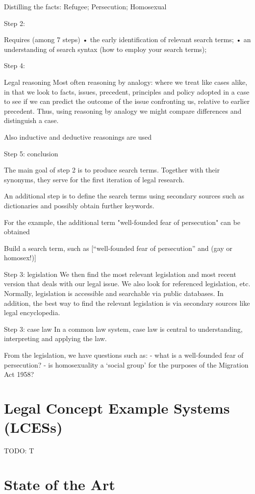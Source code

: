 \documentclass{IOS-Book-Article}
\begin{document}
Distilling the facts: Refugee; Persecution; Homosexual

Step 2:

Requires (among 7 steps)
• the early identification of relevant search terms;
• an understanding of search syntax (how to employ your search terms);

Step 4:

Legal reasoning
Most often reasoning by analogy: where we treat like cases alike, in that we look to facts, issues, precedent, principles and policy adopted in a case to see if we can predict the outcome of the issue confronting us, relative to earlier precedent. Thus, using reasoning by analogy we might compare differences and distinguish a case.

Also inductive and deductive reasonings are used

Step 5: conclusion

The main goal of step 2 is to produce search terms. Together with their synonyms, they serve for the first iteration of legal research.

An additional step is to define the search terms using secondary sources such as dictionaries and possibly obtain further keywords.

For the example, the additional term "well-founded fear of persecution" can be obtained

Build a search term, such as [“well-founded fear of persecution” and (gay or homosex!)]

Step 3: legislation
We then find the most relevant legislation and most recent version that deals with our legal issue. We also look for referenced legislation, etc. Normally, legislation is accessible and searchable via public databases. In addition, the best way to find the relevant legislation is via secondary sources like legal encyclopedia.

Step 3: case law
In a common law system, case law is central to
understanding, interpreting and applying the law.

From the legislation, we have questions such as:
- what is a well-founded fear of persecution?
- is homosexuality a ‘social group’ for the purposes of the Migration Act 1958?

\section{Legal Concept Example Systems (LCESs)}

TODO: T

\section{State of the Art}
\label{sec:sota}
\end{document}
